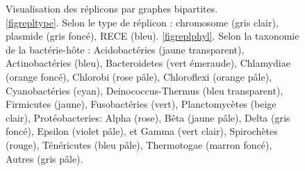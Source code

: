 \begin{landscape}
\begin{figure}
\begin{minipage}[t]{0.5\linewidth}
\end{minipage}
\caption[Visualisation des réplicons par graphe bipartite]{Visualisation des réplicons par graphes bipartites.\\\medskip \ref{figrepltype}. Selon le type de réplicon : chromosome (gris clair), plasmide (gris foncé), RECE (bleu). \ref{figreplphyl}. Selon la taxonomie de la bactérie-hôte : Acidobactéries (jaune transparent), Actinobactéries (bleu), Bacteroidetes (vert émeraude), Chlamydiae (orange foncé), Chlorobi (rose pâle), Chloroflexi (orange pâle), Cyanobactéries (cyan), Deinococcus-Thermus (bleu transparent), Firmicutes (jaune), Fusobactéries (vert), Planctomycètes (beige clair), Protéobacteries: Alpha (rose), Bêta (jaune pâle), Delta (gris foncé), Epsilon (violet pâle), et Gamma (vert clair), Spirochètes (rouge), Ténéricutes (bleu pâle), Thermotogae (marron foncé), Autres (gris pâle).}\label{figgrapherepl}
\end{figure}
\end{landscape}


